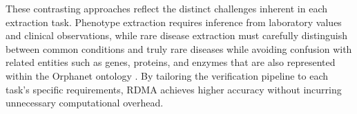 These contrasting approaches reflect the distinct challenges inherent in each extraction task. Phenotype extraction requires inference from laboratory values and clinical observations, while rare disease extraction must carefully distinguish between common conditions and truly rare diseases while avoiding confusion with related entities such as genes, proteins, and enzymes that are also represented within the Orphanet ontology \cite{weinreich2008orphanet}. By tailoring the verification pipeline to each task's specific requirements, RDMA achieves higher accuracy without incurring unnecessary computational overhead.
\clearpage